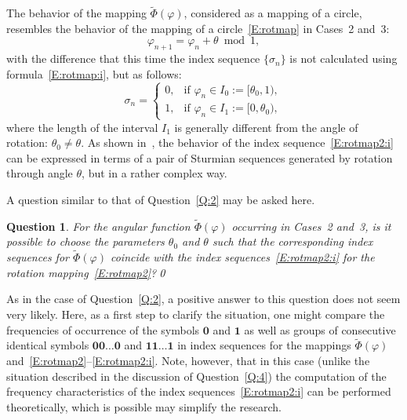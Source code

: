 \documentclass[a4paper,10pt,reqno]{amsart}
\let\cite\citep
\newtheorem{question}{Question}
\begin{document}
The behavior of the mapping $\tilde{\varPhi}(\varphi)$, considered as a
mapping of a circle, resembles the behavior of the mapping of a
circle~\eqref{E:rotmap} in Cases~2 and~3:
\begin{equation}\label{E:rotmap2}
\varphi_{n+1} = \varphi_{n} +\theta\bmod1,
\end{equation}
with the difference that this time the index sequence $\{\sigma_{n}\}$ is not
calculated using formula~\eqref{E:rotmap:i}, but as follows:
\begin{equation}\label{E:rotmap2:i}
\sigma_{n}=\begin{cases}
0,&\text{if~}\varphi_{n}\in I_{0}:=[\theta_{0},1),\\
1,&\text{if~}\varphi_{n}\in I_{1}:=[0,\theta_{0}),
\end{cases}
\end{equation}
where the length of the interval $I_{1}$ is generally different from the
angle of rotation: $\theta_{0}\neq\theta$. As shown in~\cite{BV:TCS02}, the
behavior of the index sequence~\eqref{E:rotmap2:i} can be expressed in terms
of a pair of Sturmian sequences generated by rotation through angle $\theta$,
but in a rather complex way.

A question similar to that of Question~\ref{Q:2} may be asked here.

\begin{question}\label{Q:6}\rm
For the angular function $\tilde{\varPhi}(\varphi)$ occurring in Cases~2
and~3, is it possible to choose the parameters $\theta_{0}$ and $\theta$ such
that the corresponding index sequences for $\tilde{\varPhi}(\varphi)$
coincide with the index sequences~\eqref{E:rotmap2:i} for the rotation
mapping~\eqref{E:rotmap2}?\qed
\end{question}

As in the case of Question~\ref{Q:2}, a positive answer to this question does
not seem very likely. Here, as a first step to clarify the situation, one
might compare the frequencies of occurrence of the symbols $\boldsymbol{0}$
and $\boldsymbol{1}$ as well as groups of consecutive identical symbols
$\boldsymbol{00\ldots0}$ and $\boldsymbol{11\ldots1}$ in index sequences for
the mappings $\tilde{\varPhi}(\varphi)$
and~\eqref{E:rotmap2}--\eqref{E:rotmap2:i}. Note, however, that in this case
(unlike the situation described in the discussion of Question~\ref{Q:4}) the
computation of the frequency characteristics of the index
sequences~\eqref{E:rotmap2:i} can be performed theoretically, which is
possible may simplify the research.
\end{document}
